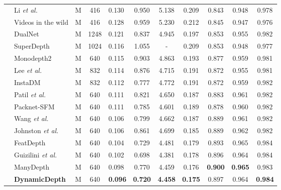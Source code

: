 \documentclass[runningheads]{llncs}
\newcommand{\etal}{\textit{et al.}}
\begin{document}
\begin{center}
\begin{table*}[t]
{\begin{tabular}{|l|l|c|c||a|c|c|c|c|c|c|}
& Li \etal \cite{li2020unsupervised}          & M    & 416 &0.130 & 0.950 & 5.138 & 0.209 & 0.843 & 0.948 & 0.978 \\
&  Videos in the wild \cite{gordon2019depth}  & M  &  416& 0.128 & 0.959  & 5.230 & 0.212 & 0.845 & 0.947 & 0.976 \\
&DualNet~\cite{dualnet}                       &M &1248 &0.121 &0.837 &4.945 &0.197 &0.853 &0.955 &0.982\\
&SuperDepth~\cite{pillai2018superdepth}       &M &1024 &0.116 &1.055 &-     &0.209 &0.853 &0.948 &0.977\\
& Monodepth2 \cite{monodepth2}                & M  &640 & 0.115 &   0.903 &   4.863 &0.193 & 0.877 &0.959 &0.981 \\ 
& Lee \etal~\cite{lee2021attentive}           & M & 832 &0.114 &0.876 &4.715 &0.191 &0.872 &0.955 &0.981\\
& InstaDM~\cite{instadm}                      & M    & 832 &0.112 &0.777 &4.772 &0.191 &0.872 &0.959 &0.982 \\
& Patil \etal \cite{patil2020dont}            & M & 640  & 0.111  & 0.821  & 4.650  & 0.187  & 0.883  & 0.961  & 0.982 \\
& Packnet-SFM \cite{packnet}                  & M & 640 & 0.111 & 0.785 & 4.601 & 0.189 & 0.878 & 0.960 & 0.982 \\
& Wang \etal \cite{wang2020self}              & M & 640  & 0.106  & 0.799  & 4.662  & 0.187  & 0.889  & 0.961  & 0.982 \\
& Johnston \etal~\cite{johnston2020self}      & M & 640 & 0.106 & 0.861 & 4.699 & 0.185 & 0.889 & 0.962 & 0.982 \\
&FeatDepth~\cite{featdepth}                   &M &640 &0.104 &0.729 &4.481 &0.179 &0.893 &0.965 &0.984\\
&Guizilini \etal \cite{guizilini2020semantically} & M  & 640 &0.102 & 0.698 & 4.381 & 0.178 & 0.896 & 0.964 & 0.984 \\
&ManyDepth~\cite{manydepth}                   & M  & 640 &   0.098  &   0.770  &   4.459  &   0.176  &   \textbf{0.900}  &   \textbf{0.965}  &   0.983 \\
&\textbf{DynamicDepth} & M   & 640 &    \textbf{0.096}  &   \textbf{0.720}  &  \textbf{4.458}  &  \textbf{0.175}  &  0.897  &  0.964  &  \textbf{0.984}\\
        
\hline\hline



\end{tabular}}
\end{table*}
\end{center}
\end{document}
